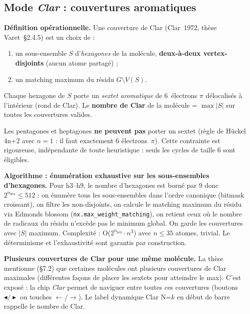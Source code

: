 \subsection{Mode \emph{Clar} : couvertures aromatiques}
\label{sec:molviz-clar}


\textbf{Définition opérationnelle.} Une couverture de Clar
(Clar~1972, thèse Varet~\S2.4.5) est un choix de :
\begin{enumerate}
  \item un sous-ensemble $S$ d'\emph{hexagones} de la molécule,
    \textbf{deux-à-deux vertex-disjoints} (aucun atome partagé) ;
  \item un matching maximum du résidu $G \setminus V(S)$.
\end{enumerate}
Chaque hexagone de $S$ porte un \emph{sextet aromatique} de 6~électrons
$\pi$ délocalisés à l'intérieur (\og{}rond de Clar\fg{}). Le
\textbf{nombre de Clar} de la molécule = $\max |S|$ sur toutes les
couvertures valides.

Les pentagones et heptagones \textbf{ne peuvent pas} porter un sextet
(règle de Hückel 4n+2 avec $n=1$ : il faut exactement 6 électrons~$\pi$).
Cette contrainte est rigoureuse, indépendante de toute heuristique :
seuls les cycles de taille 6 sont éligibles.

\textbf{Algorithme : énumération exhaustive sur les sous-ensembles
d'hexagones.} Pour h3--h9, le nombre d'hexagones est borné par 9 donc
$2^{n_{\text{hex}}} \leq 512$ : on énumère tous les sous-ensembles dans
l'ordre canonique (bitmask croissant), on filtre les non-disjoints, on
calcule le matching maximum du résidu via Edmonds blossom
(\texttt{nx.max\_weight\_matching}), on retient ceux où le nombre de
radicaux du résidu n'excède pas le minimum global. On garde les
couvertures avec $|S|$ maximum. Complexité : O($2^{n_{\text{hex}}} \cdot
n^3$) avec $n \leq 35$ atomes, trivial. Le déterminisme et
l'exhaustivité sont garantis par construction.

\textbf{Plusieurs couvertures de Clar pour une même molécule.} La thèse
mentionne (\S7.2) que certaines molécules ont plusieurs couvertures de
Clar maximales (différentes façons de placer les sextets pour atteindre
le max). C'est exposé : la chip \emph{Clar} permet de naviguer entre
toutes ces couvertures (boutons $\blacktriangleleft / \blacktriangleright$
ou touches $\leftarrow / \rightarrow$). Le label dynamique
\og{}Clar N=$k$\fg{} en début de barre rappelle le nombre de Clar.

